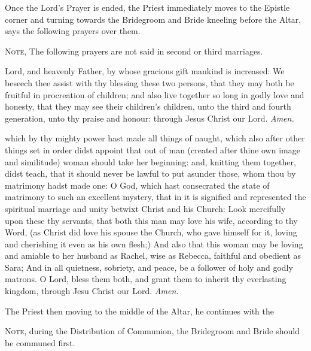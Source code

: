 \clearpage
\begin{rubric}
    Once the Lord's Prayer is ended, the Priest immediately moves to the Epistle corner and turning towards the Bridegroom and Bride kneeling before the Altar, says the following prayers over them.
\end{rubric}
\begin{rubric}
	\textsc{Note,} The following prayers are not said in second or third marriages.
\end{rubric}
 Lord, and heavenly Father, by whose gracious gift mankind is increased: We beseech thee assist with thy blessing these two persons, that they may both be fruitful in procreation of children; and also live together so long in godly love and honesty, that they may see their children's children, unto the third and fourth generation, unto thy praise and honour: through Jesus Christ our Lord. \textit{Amen.}\par
{} which by thy mighty power hast made all things of naught, which also after other things set in order didst appoint that out of man (created after thine own image and similitude) woman should take her beginning: and, knitting them together, didst teach, that it should never be lawful to put asunder those, whom thou by matrimony hadst made one: O God, which hast consecrated the state of matrimony to such an excellent mystery, that in it is signified and represented the spiritual marriage and unity betwixt Christ and his Church: Look mercifully upon these thy servants, that both this man may love his wife, according to thy Word, (as Christ did love his spouse the Church, who gave himself for it, loving and cherishing it even as his own flesh;) And also that this woman may be loving and amiable to her husband as Rachel, wise as Rebecca, faithful and obedient as Sara; And in all quietness, sobriety, and peace, be a follower of holy and godly matrons. O Lord, bless them both, and grant them to inherit thy everlasting kingdom, through Jesu Christ our Lord. \textit{Amen.}

\begin{rubric}
    The Priest then moving to the middle of the Altar, he continues with the \par
    \textsc{Note,} during the Distribution of Communion, the Bridegroom and Bride should be communed first.
\end{rubric}


